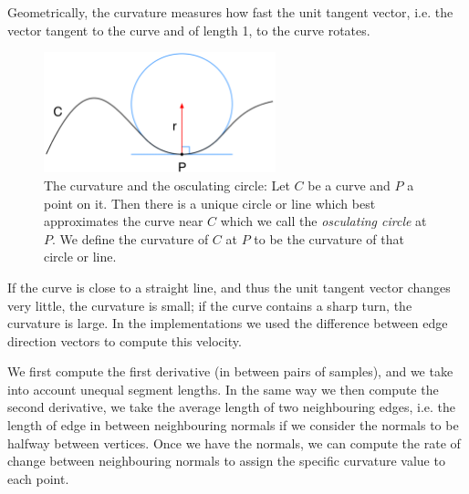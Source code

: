 
Geometrically, the curvature measures how fast the unit tangent vector, i.e. the vector tangent to the curve and of length 1,  to the curve rotates. 

\begin{figure}[H]
	\centering
	\includegraphics[width=0.6\textwidth]{../Figures/curveCircle.png}
	\caption{The curvature and the osculating circle: Let \( C \) be a curve and \( P \) a point on it. Then there is a unique circle or line which best approximates the curve near \( C \) which we call the \textit{osculating circle} at \( P \). We define the curvature of \( C \) at \( P \) to be the curvature of that circle or line. 
		}
	\label{fig:curveCircle}
\end{figure}

If the curve is close to a straight line, and thus the unit tangent vector changes very little, the curvature is small; if the curve contains a sharp turn, the curvature is large.
In the implementations we used the difference between edge direction vectors to compute this velocity.



We first compute the first derivative (in between pairs of samples), and we take into account unequal segment lengths. In the same way we then compute the second derivative, we take the average length of two neighbouring edges, i.e. the length of edge in between neighbouring normals if we consider the normals to be halfway between vertices.
Once we have the normals, we can compute the rate of change between neighbouring normals to assign the specific curvature value to each point.

